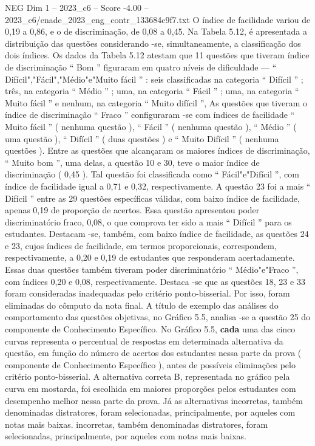 \begin{textsample}{NEG Dim 1 – 2023\_c6 – Score -4.00 – 2023\_c6/enade\_2023\_eng\_contr\_133684c9f7.txt}
O índice de facilidade variou de 0,19 a 0,86, e o de discriminação, de 0,08 a 0,45.
Na Tabela 5.12, é apresentada a distribuição das questões considerando -se, simultaneamente, a classificação dos dois índices.
Os dados da Tabela 5.12 atestam que 11 questões que tiveram índice de discriminação “ Bom ” figuraram em quatro níveis de dificuldade — “ Difícil","Fácil","Médio"e"Muito fácil ” : seis classificadas na categoria “ Difícil ” ; três, na categoria “ Médio ” ; uma, na categoria “ Fácil ” ; uma, na categoria “ Muito fácil ” e nenhum, na categoria “ Muito difícil ”, As questões que tiveram o índice de discriminação “ Fraco ” configuraram -se com índices de facilidade “ Muito fácil ” ( nenhuma questão ), “ Fácil ” ( nenhuma questão ), “ Médio ” ( uma questão ), “ Difícil ” ( duas questões ) e “ Muito Difícil ” ( nenhuma questões ).
Entre as questões que alcançaram os maiores índices de discriminação, “ Muito bom ”, uma delas, a questão 10 e 30, teve o maior índice de discriminação ( 0,45 ).
Tal questão foi classificada como “ Fácil"e"Difícil ”, com índice de facilidade igual a 0,71 e 0,32, respectivamente.
A questão 23 foi a mais “ Difícil ” entre as 29 questões específicas válidas, com baixo índice de facilidade, apenas 0,19 de proporção de acertos.
Essa questão apresentou poder discriminatório fraco, 0,08, o que comprova ter sido a mais “ Difícil ” para os estudantes.
Destacam -se, também, com baixo índice de facilidade, as questões 24 e 23, cujos índices de facilidade, em termos proporcionais, correspondem, respectivamente, a 0,20 e 0,19 de estudantes que responderam acertadamente.
Essas duas questões também tiveram poder discriminatório “ Médio"e"Fraco ”, com índices 0,20 e 0,08, respectivamente.
Destaca -se que as questões 18, 23 e 33 foram consideradas inadequadas pelo critério ponto-bisserial.
Por isso, foram eliminadas do cômputo da nota final.
A título de exemplo das análises do comportamento das questões objetivas, no Gráfico 5.5, analisa -se a questão 25 do componente de Conhecimento Específico.
No Gráfico 5.5, \textbf{cada} uma das cinco curvas representa o percentual de respostas em determinada alternativa da questão, em função do número de acertos dos estudantes nessa parte da prova ( componente de Conhecimento Específico ), antes de possíveis eliminações pelo critério ponto-bisserial.
A alternativa correta B, representada no gráfico pela curva em mostarda, foi escolhida em maiores proporções pelos estudantes com desempenho melhor nessa parte da prova.
Já as alternativas incorretas, também denominadas distratores, foram selecionadas, principalmente, por aqueles com notas mais baixas. incorretas, também denominadas distratores, foram selecionadas, principalmente, por aqueles com notas mais baixas.

\end{textsample}
